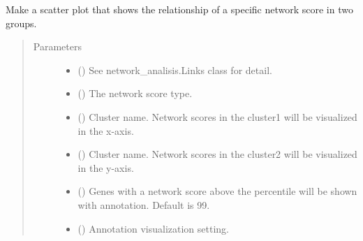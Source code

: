 \documentclass[letterpaper,10pt,english]{sphinxmanual}
\begin{document}
\begin{fulllineitems}

\begin{fulllineitems}
\label{\detokenize{modules/celloracle:celloracle.Links.plot_score_comparison_2D}}
Make a scatter plot that shows the relationship of a specific network score in two groups.
\begin{quote}\begin{description}
\item[{Parameters}] \leavevmode\begin{itemize}
\item {} 
 ({\hyperref[\detokenize{modules/celloracle:celloracle.Links}]{}}) \textendash{} See network\_analisis.Links class for detail.

\item {} 
 () \textendash{} The network score type.

\item {} 
 () \textendash{} Cluster name. Network scores in the cluster1 will be visualized in the x-axis.

\item {} 
 () \textendash{} Cluster name. Network scores in the cluster2 will be visualized in the y-axis.

\item {} 
 () \textendash{} Genes with a network score above the percentile will be shown with annotation. Default is 99.

\item {} 
 (\sphinxstyleliteralemphasis{\sphinxupquote{(}}\sphinxstyleliteralemphasis{\sphinxupquote{, }}\sphinxstyleliteralemphasis{\sphinxupquote{)}}) \textendash{} Annotation visualization setting.


\end{itemize}
\end{description}
\end{quote}
\end{fulllineitems}
\end{fulllineitems}
\end{document}
